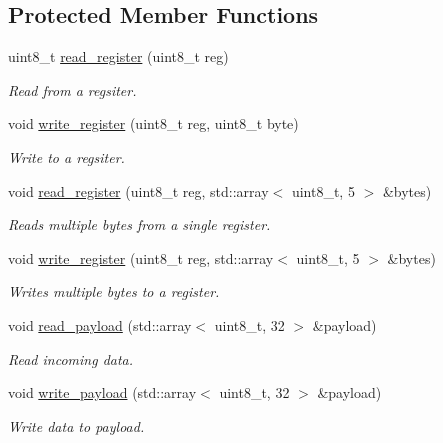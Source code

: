 \subsection*{Protected Member Functions}
\begin{DoxyCompactItemize}
\item 
uint8\+\_\+t \hyperlink{classNRF24_abaddce712f45103e2ba5c7dd469d0f43}{read\+\_\+register} (uint8\+\_\+t reg)
\begin{DoxyCompactList}\small\item\em Read from a regsiter. \end{DoxyCompactList}\item 
void \hyperlink{classNRF24_abbcc96350aaa147dca8af1f7e93ea6ec}{write\+\_\+register} (uint8\+\_\+t reg, uint8\+\_\+t byte)
\begin{DoxyCompactList}\small\item\em Write to a regsiter. \end{DoxyCompactList}\item 
void \hyperlink{classNRF24_a3e34e1a79e35a382137b176cbe4359b8}{read\+\_\+register} (uint8\+\_\+t reg, std\+::array$<$ uint8\+\_\+t, 5 $>$ \&bytes)
\begin{DoxyCompactList}\small\item\em Reads multiple bytes from a single register. \end{DoxyCompactList}\item 
void \hyperlink{classNRF24_afca9ea1e390b23f5e220a0d0e823a4e3}{write\+\_\+register} (uint8\+\_\+t reg, std\+::array$<$ uint8\+\_\+t, 5 $>$ \&bytes)
\begin{DoxyCompactList}\small\item\em Writes multiple bytes to a register. \end{DoxyCompactList}\item 
void \hyperlink{classNRF24_a3ad77490f14987e7349425799d40207e}{read\+\_\+payload} (std\+::array$<$ uint8\+\_\+t, 32 $>$ \&payload)
\begin{DoxyCompactList}\small\item\em Read incoming data. \end{DoxyCompactList}\item 
void \hyperlink{classNRF24_a30f43278c0048409e32fb21fff5f448b}{write\+\_\+payload} (std\+::array$<$ uint8\+\_\+t, 32 $>$ \&payload)
\begin{DoxyCompactList}\small\item\em Write data to payload. \end{DoxyCompactList}\item 

\end{DoxyCompactItemize}
